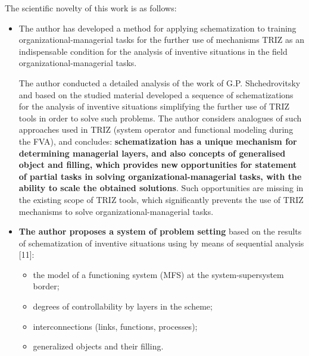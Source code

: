 \documentclass[11pt,a4paper]{book}
\begin{document}
The scientific novelty of this work is as follows:
\begin{itemize}
\item The author has developed a method for applying schematization to
  training organizational-managerial tasks for the further use of mechanisms
  TRIZ as an indispensable condition for the analysis of inventive situations
  in the field organizational-managerial tasks.

  The author conducted a detailed analysis of the work of G.P. Shchedrovitsky
  and based on the studied material developed a sequence of schematizations
  for the analysis of inventive situations simplifying the further use of TRIZ
  tools in order to solve such problems. The author considers analogues of
  such approaches used in TRIZ (system operator and functional modeling during
  the FVA), and concludes: \textbf{schematization has a unique mechanism for
    determining managerial layers, and also concepts of generalised object and
    filling, which provides new opportunities for statement of partial tasks
    in solving organizational-managerial tasks, with the ability to scale the
    obtained solutions}. Such opportunities are missing in the existing scope
  of TRIZ tools, which significantly prevents the use of TRIZ mechanisms to
  solve organizational-managerial tasks.
\item \textbf{The author proposes a system of problem setting} based on the
  results of schematization of inventive situations using by means of
  sequential analysis [11]:
  \begin{itemize}
  \item the model of a functioning system (MFS) at the system-supersystem
    border;
  \item degrees of controllability by layers in the scheme;
  \item interconnections (links, functions, processes);
  \item generalized objects and their filling.
  \end{itemize}
  

\end{itemize}
\end{document}
